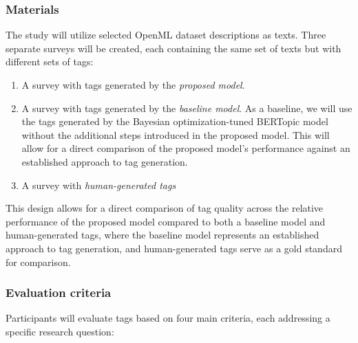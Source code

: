 \subsubsection{Materials}
The study will utilize selected OpenML dataset descriptions as texts. Three separate surveys will be created, each containing the same set of texts but with different sets of tags:

\begin{enumerate}
\item A survey with tags generated by the \textit{proposed model}.
\item A survey with tags generated by the \textit{baseline model}. As a baseline, we will use the tags generated by the Bayesian optimization-tuned BERTopic model without the additional steps introduced in the proposed model. This will allow for a direct comparison of the proposed model's performance against an established approach to tag generation.
\item A survey with \textit{human-generated tags}
\end{enumerate}

This design allows for a direct comparison of tag quality across the relative performance of the proposed model compared to both a baseline model and human-generated tags, where the baseline model represents an established approach to tag generation, and human-generated tags serve as a gold standard for comparison.

\subsubsection{Evaluation criteria}
Participants will evaluate tags based on four main criteria, each addressing a specific research question:

